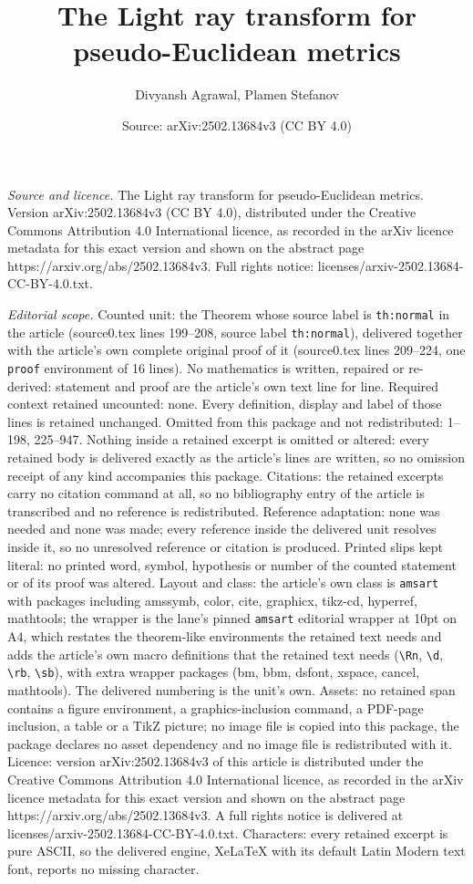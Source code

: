 \documentclass[10pt,a4paper]{amsart}
\title[The Light ray transform for pseudo-Euclidean metrics]{The Light ray transform for pseudo-Euclidean metrics}
\author{Divyansh Agrawal, Plamen Stefanov}
\date{Source: arXiv:2502.13684v3 (CC BY 4.0)}
\begin{document}
\maketitle

\noindent\emph{Source and licence.} The Light ray transform for pseudo-Euclidean metrics. Version arXiv:2502.13684v3 (CC BY 4.0), distributed under the Creative Commons Attribution 4.0 International licence, as recorded in the arXiv licence metadata for this exact version and shown on the abstract page https://arxiv.org/abs/2502.13684v3. Full rights notice: licenses/arxiv-2502.13684-CC-BY-4.0.txt.\par\smallskip

\noindent\textit{Editorial scope.} Counted unit: the Theorem whose source label is \texttt{th:normal} in the article (source0.tex lines 199--208, source label \texttt{th:normal}), delivered together with the article's own complete original proof of it (source0.tex lines 209--224, one \texttt{proof} environment of 16 lines). No mathematics is written, repaired or re-derived: statement and proof are the article's own text line for line. Required context retained uncounted: none. Every definition, display and label of those lines is retained unchanged. Omitted from this package and not redistributed: 1--198, 225--947. Nothing inside a retained excerpt is omitted or altered: every retained body is delivered exactly as the article's lines are written, so no omission receipt of any kind accompanies this package. Citations: the retained excerpts carry no citation command at all, so no bibliography entry of the article is transcribed and no reference is redistributed. Reference adaptation: none was needed and none was made; every reference inside the delivered unit resolves inside it, so no unresolved reference or citation is produced. Printed slips kept literal: no printed word, symbol, hypothesis or number of the counted statement or of its proof was altered. Layout and class: the article's own class is \texttt{amsart} with packages including amssymb, color, cite, graphicx, tikz-cd, hyperref, mathtools; the wrapper is the lane's pinned \texttt{amsart} editorial wrapper at 10pt on A4, which restates the theorem-like environments the retained text needs and adds the article's own macro definitions that the retained text needs (\texttt{\textbackslash Rn}, \texttt{\textbackslash d}, \texttt{\textbackslash rb}, \texttt{\textbackslash sb}), with extra wrapper packages (bm, bbm, dsfont, xspace, cancel, mathtools). The delivered numbering is the unit's own. Assets: no retained span contains a figure environment, a graphics-inclusion command, a PDF-page inclusion, a table or a TikZ picture; no image file is copied into this package, the package declares no asset dependency and no image file is redistributed with it. Licence: version arXiv:2502.13684v3 of this article is distributed under the Creative Commons Attribution 4.0 International licence, as recorded in the arXiv licence metadata for this exact version and shown on the abstract page https://arxiv.org/abs/2502.13684v3. A full rights notice is delivered at licenses/arxiv-2502.13684-CC-BY-4.0.txt. Characters: every retained excerpt is pure ASCII, so the delivered engine, XeLaTeX with its default Latin Modern text font, reports no missing character.
\end{document}
